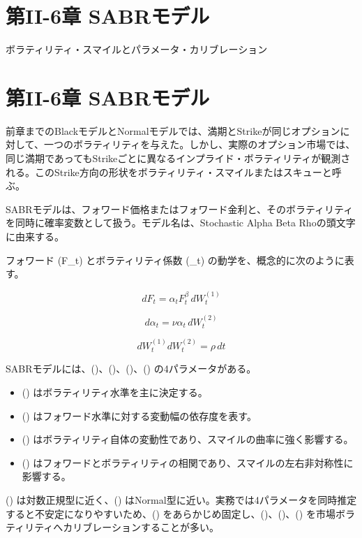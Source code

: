 \documentclass[
  letterpaper,
  DIV=11,
  numbers=noendperiod]{scrreprt}
\providecommand{\tightlist}{%
  \setlength{\itemsep}{0pt}\setlength{\parskip}{0pt}}
\begin{document}
\chapter{第II-6章
SABRモデル}\label{ux7b2cii-6ux7ae0-sabrux30e2ux30c7ux30eb}

ボラティリティ・スマイルとパラメータ・カリブレーション

\hfill\break

\chapter{第II-6章
SABRモデル}\label{ux7b2cii-6ux7ae0-sabrux30e2ux30c7ux30eb-1}

前章までのBlackモデルとNormalモデルでは、満期とStrikeが同じオプションに対して、一つのボラティリティを与えた。しかし、実際のオプション市場では、同じ満期であってもStrikeごとに異なるインプライド・ボラティリティが観測される。このStrike方向の形状をボラティリティ・スマイルまたはスキューと呼ぶ。

SABRモデルは、フォワード価格またはフォワード金利と、そのボラティリティを同時に確率変数として扱う。モデル名は、Stochastic
Alpha Beta Rhoの頭文字に由来する。

フォワード (F\_t) とボラティリティ係数 (\alpha\_t)
の動学を、概念的に次のように表す。

\[
dF_t
=
\alpha_t F_t^\beta\,dW_t^{(1)}
\]

\[
d\alpha_t
=
\nu\alpha_t\,dW_t^{(2)}
\]

\[
dW_t^{(1)}dW_t^{(2)}
=
\rho\,dt
\]

SABRモデルには、(\alpha)、(\beta)、(\nu)、(\rho) の4パラメータがある。

\begin{itemize}
\tightlist
\item
  (\alpha) はボラティリティ水準を主に決定する。
\item
  (\beta) はフォワード水準に対する変動幅の依存度を表す。
\item
  (\nu)
  はボラティリティ自体の変動性であり、スマイルの曲率に強く影響する。
\item
  (\rho)
  はフォワードとボラティリティの相関であり、スマイルの左右非対称性に影響する。
\end{itemize}

() は対数正規型に近く、()
はNormal型に近い。実務では4パラメータを同時推定すると不安定になりやすいため、(\beta)
をあらかじめ固定し、(\alpha)、(\nu)、(\rho)
を市場ボラティリティへカリブレーションすることが多い。
\end{document}
